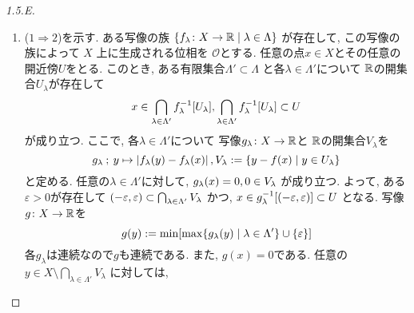 \documentclass[uplatex, dvipdfmx, a4paper, 12pt, class=jsarticle, crop=false]{standalone}
\begin{document}
\renewcommand{\labelenumi}{(\alph{enumi})}
\begin{proof}[1.5.E]\label{eng-1-5-E-proof}
	\begin{enumerate}
		\item (\( 1 \Longrightarrow 2\))を示す.
		ある写像の族
		\( \setcomp{\morph{f_\lambda}{X}{\R}}
		{\lambda \in \Lambda} \)
		が存在して, この写像の族によって
		\( X \) 上に生成される位相を
		\( \mathcal{O} \)とする.
		任意の点\( x \in X \)とその任意の開近傍\( U \)をとる.
		このとき, ある有限集合\( \Lambda' \subset \Lambda \)
		と各\( \lambda \in \Lambda' \)について
		\( \mathbb{R} \)の開集合\( U_\lambda \)が存在して
		\[ x \in \bigcap_{\lambda \in \Lambda'}
		\mapinvset{f_\lambda}{U_\lambda},
		\bigcap_{\lambda \in \Lambda'}
		\mapinvset{f_\lambda}{U_\lambda} \subset U \]
		が成り立つ.
		ここで, 各\( \lambda \in \Lambda' \)について
		写像\( g_\lambda\colon X\to\mathbb{R} \)と
		\( \mathbb{R} \)の開集合\( V_\lambda \)を
		\[ g_\lambda \semicolon y \mapsto
		\abs{\mappt{f_\lambda}{y} - \mappt{f_\lambda}{x}},
		V_\lambda \defeq \setcomp{y - f(x)}
		{y \in U_\lambda} \]
		と定める.
		任意の\( \lambda \in \Lambda' \)に対して,
		\( \mappt{g_\lambda}{x} = 0, 0 \in  V_\lambda \)
		が成り立つ.
		よって, ある\( \varepsilon > 0 \)が存在して
		\( \left( -\varepsilon , \varepsilon \right)
		\subset \bigcap_{\lambda \in \Lambda'} V_\lambda\)
		かつ,
		\( x \in \mapinvset{g_\lambda}
		{\intoo{-\varepsilon}{\varepsilon}} \subset U\)
		となる.
		写像\( g\colon X\to\mathbb{R} \)を
		\[ g(y) \defeq \min \lrbrack{
		\max \setcomp{\mappt{g_\lambda}{y}}{\lambda \in \Lambda'}
		\cup \lrbrace{\varepsilon}} \]
		各\( g_\lambda \)は連続なので\( g \)も連続である.
		また, \( g(x) = 0 \)である.
		任意の\( y \in X \setminus \bigcap_{\lambda \in \Lambda'} V_\lambda \)
		に対しては, 
	\end{enumerate}
\end{proof}
\end{document}
